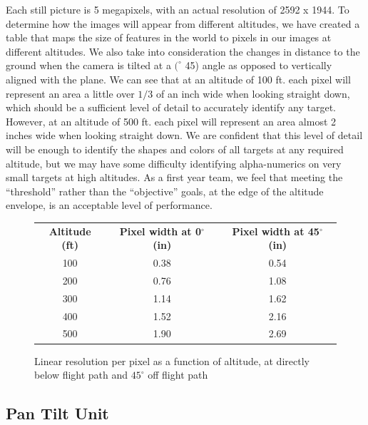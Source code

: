 \documentclass[pdftex,10pt,letter]{article}
\newcommand{\degrees}[1]
{
\begin{math}
#1^{\circ} 
\end{math}
}
\begin{document}
Each still picture is 5 megapixels, with an actual resolution of 2592 x 1944.  To determine how the images will appear from different altitudes, we have created a table that maps the size of features in the world to pixels in our images at different altitudes.  We also take into consideration the changes in distance to the ground when the camera is tilted at a \degrees(45) angle as opposed to vertically aligned with the plane.  We can see that at an altitude of 100 ft. each pixel will represent an area a little over $1/3$ of an inch wide when looking straight down, which should be a sufficient level of detail to accurately identify any target.  However, at an altitude of 500 ft. each pixel will represent an area almost 2 inches wide when looking straight down.  We are confident that this level of detail will be enough to identify the shapes and colors of all targets at any required altitude, but we may have some difficulty identifying alpha-numerics on very small targets at high altitudes.  As a first year team, we feel that meeting the ``threshold'' rather than the ``objective'' goals, at the edge of the altitude envelope, is an acceptable level of performance.

\begin{figure} [H]
	\centering
		\begin{tabular}{ccc}
		\\{\bf Altitude (ft)} & {\bf Pixel width at 0$^{\circ}$ (in)} & {\bf Pixel width at 45$^{\circ}$ (in)} \\
	       100 &       0.38 &       0.54 \\
	       200 &       0.76 &       1.08 \\
	       300 &       1.14 &       1.62 \\
	       400 &       1.52 &       2.16 \\
	       500 &       1.90 &       2.69 \\
		\end{tabular}
		\caption[Pixel Width Mapping]{Linear resolution per pixel as a function of altitude, at directly below flight path and \degrees{45} off flight path}
		\label{fig:pixelmapping}
\end{figure}

\subsection{Pan Tilt Unit}
\end{document}
